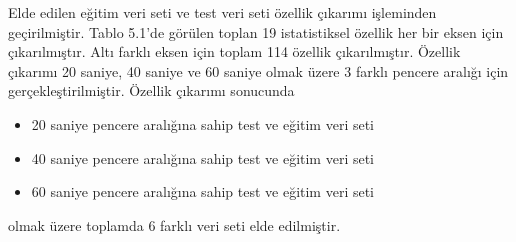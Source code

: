 Elde edilen eğitim veri seti ve test veri seti özellik çıkarımı işleminden geçirilmiştir. Tablo 5.1'de görülen toplan 19 istatistiksel özellik her bir eksen için çıkarılmıştır. Altı farklı eksen için toplam 114 özellik çıkarılmıştır. Özellik çıkarımı 20 saniye, 40 saniye ve 60 saniye olmak üzere 3 farklı pencere aralığı için gerçekleştirilmiştir. Özellik çıkarımı sonucunda 
\begin{itemize}
  \item 20 saniye pencere aralığına sahip test ve eğitim veri seti
  \item 40 saniye pencere aralığına sahip test ve eğitim veri seti
  \item 60 saniye pencere aralığına sahip test ve eğitim veri seti
\end{itemize}
olmak üzere toplamda 6 farklı veri seti elde edilmiştir.



